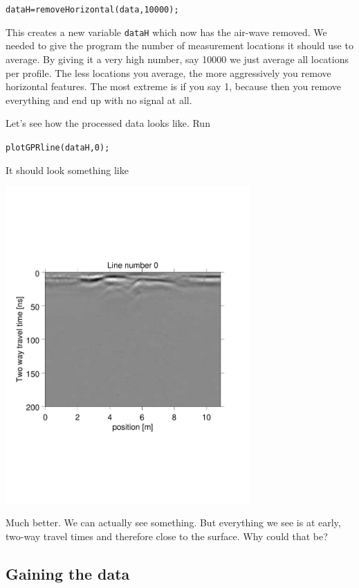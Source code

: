 \documentclass[11pt]{article}
\begin{document}
\qquad\verb#dataH=removeHorizontal(data,10000);#

This creates a new variable \verb#dataH# which now has the air-wave
removed. We needed to give the program the number of measurement
locations it should use to average. By giving it a very high number,
say \si{10000} we just average all locations per profile. The less
locations you average, the more aggressively you remove horizontal
features. The most extreme is if you say 1, because then you remove
everything and end up with no signal at all.

Let's see how the processed data looks like. Run

\qquad \verb#plotGPRline(dataH,0);#

It should look something like

\begin{center}
\includegraphics[width=0.7\textwidth, trim = 0.9cm 6cm 2cm
  6.5cm,clip]{figures/GPRlineH0}
\end{center}
 
Much better. We can actually see something. But everything we see is
at early, two-way travel times and therefore close to the surface. Why
could that be?

\subsection{Gaining the data}
\end{document}
